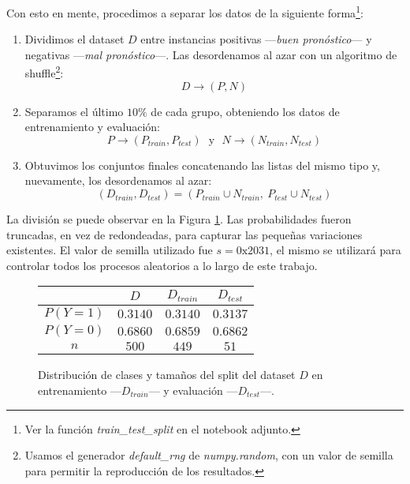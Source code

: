 Con esto en mente, procedimos a separar los datos de la siguiente forma\footnote{Ver la función \textit{train\_test\_split} en el notebook adjunto.}:

\begin{enumerate}
    \item Dividimos el dataset $D$ entre instancias positivas ---\textit{buen pronóstico}--- y negativas ---\textit{mal pronóstico}---. Las desordenamos al azar con un algoritmo de shuffle\footnote{Usamos el generador \textit{default\_rng} de \textit{numpy.random}, con un valor de semilla para permitir la reproducción de los resultados.}: $$D \rightarrow (P, N)$$
    \item Separamos el último $10\%$ de cada grupo, obteniendo los datos de entrenamiento y evaluación: $$P \rightarrow (P_{train}, P_{test})\ \ \ \text{y}\ \ \ N \rightarrow (N_{train}, N_{test})$$
    \item Obtuvimos los conjuntos finales concatenando las listas del mismo tipo y, nuevamente, los desordenamos al azar: $$(D_{train}, D_{test}) = (P_{train} \cup N_{train},\ P_{test} \cup N_{test})$$
\end{enumerate}

\vspace{0.5em}
La división se puede observar en la Figura \ref{distribucion}. Las probabilidades fueron truncadas, en vez de redondeadas, para capturar las pequeñas variaciones existentes. El valor de semilla utilizado fue $s = \text{0x2031}$, el mismo se utilizará para controlar todos los procesos aleatorios a lo largo de este trabajo.

\vspace{0.5em}
\begin{figure}[!htbp]
    \begin{center}
        \begin{tabular}{ |c|c|c|c| } 
         \hline
                    & $D$      & $D_{train}$ & $D_{test}$ \\
        \hline
        $P(Y=1)$   & $0.3140$ & $0.3140$    & $0.3137$   \\ 
        $P(Y=0)$   & $0.6860$ & $0.6859$    & $0.6862$   \\ 
        $n$        & $500$    & $449$       & $51$       \\ 
        \hline
        \end{tabular}
    \end{center}
    \caption{Distribución de clases y tamaños del split del dataset $D$ en entrenamiento ---$D_{train}$--- y evaluación ---$D_{test}$---.} \label{distribucion}
\end{figure}

